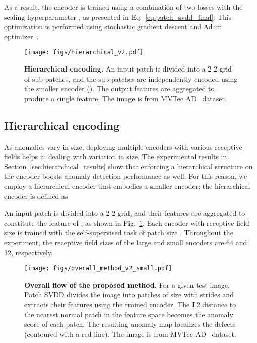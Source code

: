 \documentclass[runningheads]{llncs}
\begin{document}
As a result, the encoder is trained using a combination of two losses with the scaling hyperparameter , as presented in Eq.~\ref{eq:patch_svdd_final}.
This optimization is performed using stochastic gradient descent and Adam optimizer~\cite{adam}.




\begin{figure}[t]
    \centering
    \texttt{[image: figs/hierarchical\_v2.pdf]}
    \caption{\textbf{Hierarchical encoding.} An input patch is divided into a 2  2 grid of sub-patches, and the sub-patches are independently encoded using the smaller encoder (). The output features are aggregated to produce a single feature. The image is from MVTec AD~\cite{mvtecad} dataset.}
    \label{fig:hierarchical}
\end{figure} \subsection{Hierarchical encoding} \label{sec:hierarchical}
As anomalies vary in size, deploying multiple encoders with various receptive fields helps in dealing with variation in size.
The experimental results in Section~\ref{sec:hierarchical_results} show that enforcing a hierarchical structure on the encoder boosts anomaly detection performance as well.
For this reason, we employ a hierarchical encoder that embodies a smaller encoder; the hierarchical encoder is defined as


An input patch  is divided into a 2  2 grid, and their features are aggregated to constitute the feature of , as shown in Fig.~\ref{fig:hierarchical}.
Each encoder with receptive field size  is trained with the self-supervised task of patch size .
Throughout the experiment, the receptive field sizes of the large and small encoders are 64 and 32, respectively.



\begin{figure}[t]
    \centering
    \texttt{[image: figs/overall\_method\_v2\_small.pdf]}
    \vspace{-1em}
    \caption{\textbf{Overall flow of the proposed method.} For a given test image, Patch SVDD divides the image into patches of size  with strides  and extracts their features using the trained encoder. The L2 distance to the nearest normal patch in the feature space becomes the anomaly score of each patch. The resulting anomaly map localizes the defects (contoured with a red line). The image is from MVTec AD~\cite{mvtecad} dataset.}
    \vspace{-1em}
    \label{fig:overall_method}
\end{figure}
 
\end{document}
